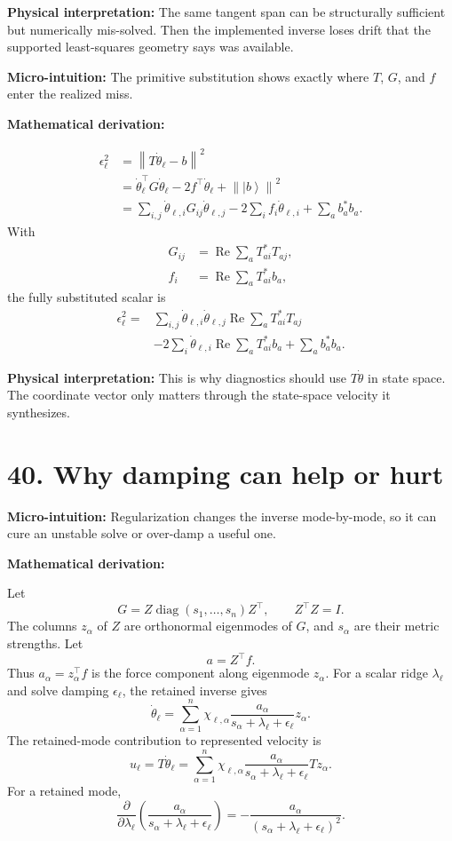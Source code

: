 \documentclass[10pt,twocolumn]{article}
\newcommand{\ket}[1]{\left|#1\right\rangle}
\newcommand{\norm}[1]{\left\lVert #1\right\rVert}
\newcommand{\diag}{\operatorname{diag}}
\newcommand{\Real}{\operatorname{Re}}
\newcommand{\Id}{I}
\newcommand{\micro}[1]{%
  \par\smallskip
  \noindent\textcolor{deepblue}{\textbf{Micro-intuition:}} #1
  \par\smallskip}
\newcommand{\deriv}{%
  \par\noindent\textcolor{deepviolet}{\textbf{Mathematical derivation:}}\par\vspace{-1mm}}
\newcommand{\phys}[1]{%
  \par\smallskip
  \noindent\textcolor{deepgreen}{\textbf{Physical interpretation:}} #1
  \par\smallskip}
\begin{document}
\phys{The same tangent span can be structurally sufficient but numerically
mis-solved. Then the implemented inverse loses drift that the supported
least-squares geometry says was available.}

\micro{The primitive substitution shows exactly where \(T\), \(G\), and \(f\)
enter the realized miss.}

\deriv
\[
\begin{aligned}
\epsilon_\ell^2
&=\norm{T\dot\theta_\ell-b}^2\\
&=\dot\theta_\ell^\top G\dot\theta_\ell
-2f^\top\dot\theta_\ell
+\norm{\ket b}^2\\
&=
\sum_{i,j}\dot\theta_{\ell,i}G_{ij}\dot\theta_{\ell,j}
-2\sum_i f_i\dot\theta_{\ell,i}
+\sum_a b_a^\ast b_a.
\end{aligned}
\]
With
\[
\begin{aligned}
G_{ij}&=\Real\sum_a T_{ai}^\ast T_{aj},\\
f_i&=\Real\sum_a T_{ai}^\ast b_a,
\end{aligned}
\]
the fully substituted scalar is
\[
\begin{aligned}
\epsilon_\ell^2
={}&
\sum_{i,j}\dot\theta_{\ell,i}\dot\theta_{\ell,j}
\Real\sum_a T_{ai}^\ast T_{aj}\\
&-
2\sum_i\dot\theta_{\ell,i}
\Real\sum_a T_{ai}^\ast b_a
+
\sum_a b_a^\ast b_a.
\end{aligned}
\]

\phys{This is why diagnostics should use \(T\dot\theta\) in state space. The
coordinate vector only matters through the state-space velocity it synthesizes.}

\section*{40. Why damping can help or hurt}

\micro{Regularization changes the inverse mode-by-mode, so it can cure an
unstable solve or over-damp a useful one.}

\deriv
Let
\[
G=Z\diag(s_1,\ldots,s_n)Z^\top,
\qquad
Z^\top Z=\Id.
\]
The columns \(z_\alpha\) of \(Z\) are orthonormal eigenmodes of \(G\), and
\(s_\alpha\) are their metric strengths.
Let
\[
a=Z^\top f.
\]
Thus \(a_\alpha=z_\alpha^\top f\) is the force component along eigenmode
\(z_\alpha\).
For a scalar ridge \(\lambda_\ell\) and solve damping \(\epsilon_\ell\), the
retained inverse gives
\[
\dot\theta_\ell
=
\sum_{\alpha=1}^{n}
\chi_{\ell,\alpha}
\frac{a_\alpha}{s_\alpha+\lambda_\ell+\epsilon_\ell}
z_\alpha.
\]
The retained-mode contribution to represented velocity is
\[
u_\ell
=
T\dot\theta_\ell
=
\sum_{\alpha=1}^{n}
\chi_{\ell,\alpha}
\frac{a_\alpha}{s_\alpha+\lambda_\ell+\epsilon_\ell}
Tz_\alpha.
\]
For a retained mode,
\[
\frac{\partial}{\partial\lambda_\ell}
\left(
\frac{a_\alpha}{s_\alpha+\lambda_\ell+\epsilon_\ell}
\right)
=
-
\frac{a_\alpha}{(s_\alpha+\lambda_\ell+\epsilon_\ell)^2}.
\]
\end{document}
